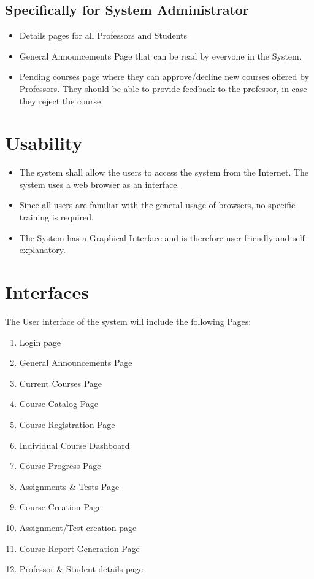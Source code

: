 \documentclass[12pt, a4]{report}
\begin{document}
\subsection{Specifically for System Administrator}
\begin{itemize}
    \item Details pages for all Professors and Students
    \item General Announcements Page that can be read by everyone in the System.
    \item Pending courses page where they can approve/decline new courses offered by Professors. They should be able to provide feedback to the professor, in case they reject the course.
\end{itemize}


\section{Usability}
\begin{itemize}
    \item The system shall allow the users to access the system from the Internet. The system uses a web browser as an interface.
    \item Since all users are familiar with the general usage of browsers, no specific training is required.
    \item The System has a Graphical Interface and is therefore user friendly and self-explanatory.
\end{itemize}


\section{Interfaces}
The User interface of the system will include the following Pages:
\begin{enumerate}
    \item Login page
    \item General Announcements Page
    \item Current Courses Page
    \item Course Catalog Page
    \item Course Registration Page
    \item Individual Course Dashboard
    \item Course Progress Page
    \item Assignments \& Tests Page
    \item Course Creation Page
    \item Assignment/Test creation page
    \item Course Report Generation Page
    \item Professor \& Student details page
\end{enumerate}
\end{document}
